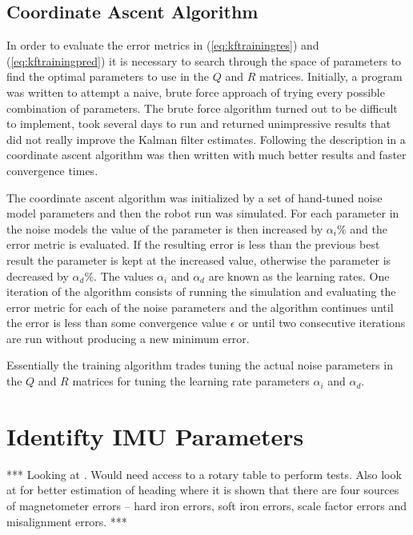 \subsection{Coordinate Ascent Algorithm}
\label{sec:coordinateAscent}
In order to evaluate the error metrics in (\ref{eq:kftrainingres}) and (\ref{eq:kftrainingpred}) it is necessary to search through the space of parameters to find the optimal parameters to use in the $Q$ and $R$ matrices. Initially, a program was written to attempt a naive, brute force approach of trying every possible combination of parameters. The brute force algorithm turned out to be difficult to implement, took several days to run and returned unimpressive results that did not really improve the Kalman filter estimates. Following the description in \cite{Abbeel-RSS-05} a coordinate ascent algorithm was then written with much better results and faster convergence times.

The coordinate ascent algorithm was initialized by a set of hand-tuned noise model parameters and then the robot run was simulated. For each parameter in the noise models the value of the parameter is then increased by $\alpha_i \%$ and the error metric is evaluated. If the resulting error is less than the previous best result the parameter is kept at the increased value, otherwise the parameter is decreased by $\alpha_d \%$. The values $\alpha_i$ and $\alpha_d$ are known as the learning rates. One iteration of the algorithm consists of running the simulation and evaluating the error metric for each of the noise parameters and the algorithm continues until the error is less than some convergence value $\epsilon$ or until two consecutive iterations are run without producing a new minimum error.

Essentially the training algorithm trades tuning the actual noise parameters in the $Q$ and $R$ matrices for tuning the learning rate parameters $\alpha_i$ and $\alpha_d$.

\section{Identifty IMU Parameters}
\label{sec:identifyimuparams}
*** Looking at \cite{ChungOjeda01}. Would need access to a rotary table to perform tests. Also look at \cite{ParkinsonHeadingEstimation01} for better estimation of heading where it is shown that there are four sources of magnetometer errors -- hard iron errors, soft iron errors, scale factor errors and misalignment errors. ***

